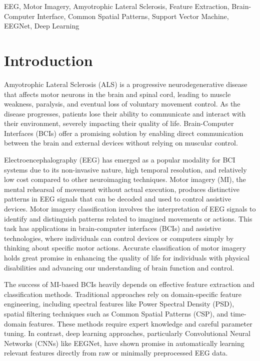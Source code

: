 \documentclass[conference]{IEEEtran}
\begin{document}
\begin{IEEEkeywords}
EEG, Motor Imagery, Amyotrophic Lateral Sclerosis, Feature Extraction, Brain-Computer Interface, Common Spatial Patterns, Support Vector Machine, EEGNet, Deep Learning
\end{IEEEkeywords}

\section{Introduction}

Amyotrophic Lateral Sclerosis (ALS) is a progressive neurodegenerative disease that affects motor neurons in the brain and spinal cord, leading to muscle weakness, paralysis, and eventual loss of voluntary movement control. As the disease progresses, patients lose their ability to communicate and interact with their environment, severely impacting their quality of life. Brain-Computer Interfaces (BCIs) offer a promising solution by enabling direct communication between the brain and external devices without relying on muscular control.

Electroencephalography (EEG) has emerged as a popular modality for BCI systems due to its non-invasive nature, high temporal resolution, and relatively low cost compared to other neuroimaging techniques. Motor imagery (MI), the mental rehearsal of movement without actual execution, produces distinctive patterns in EEG signals that can be decoded and used to control assistive devices. Motor imagery classification involves the interpretation of EEG signals to identify and distinguish patterns related to imagined movements or actions. This task has applications in brain-computer interfaces (BCIs) and assistive technologies, where individuals can control devices or computers simply by thinking about specific motor actions. Accurate classification of motor imagery holds great promise in enhancing the quality of life for individuals with physical disabilities and advancing our understanding of brain function and control.

The success of MI-based BCIs heavily depends on effective feature extraction and classification methods. Traditional approaches rely on domain-specific feature engineering, including spectral features like Power Spectral Density (PSD), spatial filtering techniques such as Common Spatial Patterns (CSP), and time-domain features. These methods require expert knowledge and careful parameter tuning. In contrast, deep learning approaches, particularly Convolutional Neural Networks (CNNs) like EEGNet, have shown promise in automatically learning relevant features directly from raw or minimally preprocessed EEG data.
\end{document}
